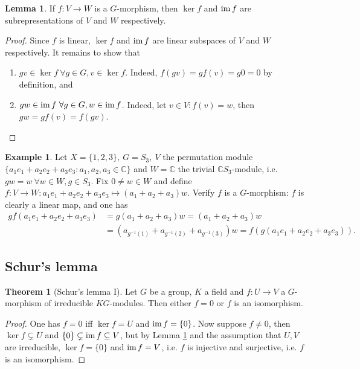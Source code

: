 \documentclass{article}
\newcommand{\C}{\mathbb{C}}
\newcommand{\im}{\text{im\,}}
\theoremstyle{definition}
\newtheorem{thm}[defn]{Theorem}
\newtheorem{lemma}[defn]{Lemma}
\newtheorem{example}[defn]{Example}
\begin{document}
\begin{lemma}
\label{lemma:kerimaresubrep}
If $f:V\rightarrow W$ is a $G$-morphism, then $\ker f$ and $\im f$ are subrepresentations of $V$ and $W$ respectively.
\end{lemma}
\begin{proof}
Since $f$ is linear, $\ker f$ and $\im f$ are linear subspaces of $V$ and $W$ respectively. It remains to show that
\begin{enumerate}
\item $gv\in\ker f \ \forall g\in G,v\in\ker f$. Indeed, $f(gv)=gf(v)=g0=0$ by definition, and
\item $gw\in\im f \ \forall g\in G,w\in\im f$. Indeed, let $v\in V:f(v)=w$, then $gw=gf(v)=f(gv)$.
\end{enumerate}
\end{proof}

\begin{example}
\label{example:S3perm}
Let $X=\{1,2,3\},\ G=S_3,\ V$ the permutation module $\{a_1e_1+a_2e_2+a_3e_3:a_1,a_2,a_3\in\C\}$ and $W=\C$ the trivial $\C S_3$-module, i.e. $gw=w \ \forall w\in W,g\in S_3$. Fix $0\neq w\in W$ and define $f:V\rightarrow W:a_1e_1+a_2e_2+a_3e_3\mapsto (a_1+a_2+a_3)w$. Verify $f$ is a $G$-morphism: $f$ is clearly a linear map, and one has
\[
\begin{aligned}
gf(a_1e_1+a_2e_2+a_3e_3)&=g(a_1+a_2+a_3)w=(a_1+a_2+a_3)w\\
&=\left(a_{g^{-1}(1)}+a_{g^{-1}(2)}+a_{g^{-1}(3)}\right)w=f(g(a_1e_1+a_2e_2+a_3e_3)).
\end{aligned}
\]
\end{example}

\subsection{Schur's lemma}
\begin{thm}[Schur's lemma I]
\label{thm:SchurslemmaI}
Let $G$ be a group, $K$ a field and $f:U\rightarrow V$ a $G$-morphism of irreducible $KG$-modules. Then either $f=0$ or $f$ is an isomorphism.
\end{thm}
\begin{proof}
One has $f=0$ iff $\ker f=U$ and $\im f=\{0\}$. Now suppose $f\neq 0$, then $\ker f\subsetneq U$ and $\{0\}\subsetneq \im f\subseteq V$, but by Lemma \ref{lemma:kerimaresubrep} and the assumption that $U,V$ are irreducible, $\ker f=\{0\}$ and $\im f=V$, i.e. $f$ is injective and surjective, i.e. $f$ is an isomorphism.
\end{proof}
\end{document}

